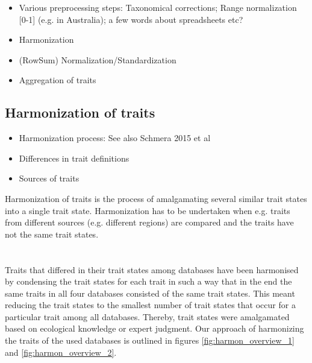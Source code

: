 \documentclass{article}
\begin{document}
\begin{itemize}
    \item Various preprocessing steps: Taxonomical corrections; Range normalization [0-1] (e.g. in Australia); a few 
    words about spreadsheets etc?
    \item Harmonization 
    \item (RowSum) Normalization/Standardization %
    \item Aggregation of traits
\end{itemize}




\subsection{Harmonization of traits}
\begin{itemize}
    \item Harmonization process: See also Schmera 2015 et al 
    \item Differences in trait definitions
    \item Sources of traits
\end{itemize}

Harmonization of traits is the process of amalgamating several similar trait states
into a single trait state. Harmonization has to be undertaken when e.g. traits from
different sources (e.g. different regions) are compared and the traits have not
the same trait states. %
\\
\\
\\
Traits that differed in their trait states among databases have been harmonised by 
condensing the trait states for each trait in such a way that in the end the same 
traits in all four databases consisted of the same trait states. 
This meant reducing the trait states to the smallest number of trait states that
occur for a particular trait among all databases. Thereby, trait states were 
amalgamated based on ecological knowledge or expert judgment. %
Our approach of harmonizing the traits of the used databases is outlined in figures 
\ref{fig:harmon_overview_1} and \ref{fig:harmon_overview_2}. 
\end{document}
